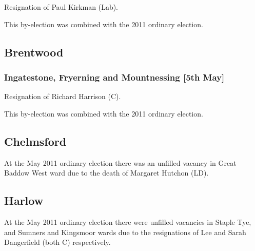\begin{resultsiii}

Resignation of Paul Kirkman (Lab).

This by-election was combined with the 2011 ordinary election.

\subsection*{Brentwood}

\subsubsection*{Ingatestone, Fryerning and Mountnessing \hspace*{\fill}\nolinebreak[1]%
\enspace\hspace*{\fill}
[5th May]}


Resignation of Richard Harrison (C).

This by-election was combined with the 2011 ordinary election.

\subsection*{Chelmsford}


At the May 2011 ordinary election there was an unfilled vacancy in Great Baddow West ward due to the death of Margaret Hutchon (LD).

\subsection*{Harlow}



At the May 2011 ordinary election there were unfilled vacancies in Staple Tye, and Sumners and Kingsmoor wards due to the resignations of Lee and Sarah Dangerfield (both C) respectively.


\end{resultsiii}
